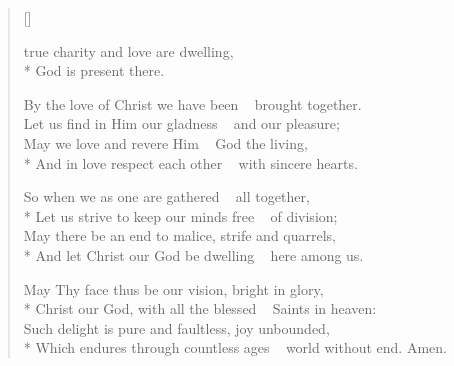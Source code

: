\newHymn
\JustHymnNum


\begin{verse}[\versewidth]

 true charity and love are dwelling,\\*
God is present there.

\pointtrans

By the love of Christ we have been ~ brought together.\\
Let us find in Him our gladness ~ and our pleasure;\\
May we love and revere Him ~ God the living,\\*
And in love respect each other ~ with sincere hearts.

So when we as one are gathered ~ all together,\\*
Let us strive to keep our minds free ~ of division;\\
May there be an end to malice, strife and quarrels,\\*
And let Christ our God be dwelling ~ here among us.

May Thy face thus be our vision, bright in glory,\\*
Christ our God, with all the blessed ~ Saints in heaven:\\
Such delight is pure and faultless, joy unbounded,\\*
Which endures through countless ages ~ world without end.
Amen.

\end{verse}


